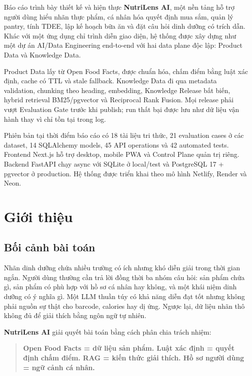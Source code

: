 \documentclass[12pt,a4paper]{report}
\newcommand{\project}{\textbf{NutriLens AI}}
\begin{document}
Báo cáo trình bày thiết kế và hiện thực \project{}, một nền tảng hỗ trợ người
dùng hiểu nhãn thực phẩm, cá nhân hóa quyết định mua sắm, quản lý pantry, tính
TDEE, lập kế hoạch bữa ăn và đặt câu hỏi dinh dưỡng có trích dẫn. Khác với một
ứng dụng chỉ trình diễn giao diện, hệ thống được xây dựng như một dự án
AI/Data Engineering end-to-end với hai data plane độc lập: Product Data và
Knowledge Data.

Product Data lấy từ Open Food Facts, được chuẩn hóa, chấm điểm bằng luật xác
định, cache có TTL và stale fallback. Knowledge Data đi qua metadata validation,
chunking theo heading, embedding, Knowledge Release bất biến, hybrid retrieval
BM25/pgvector và Reciprocal Rank Fusion. Mọi release phải vượt Evaluation Gate
trước khi publish; run thất bại được lưu như dữ liệu vận hành thay vì chỉ tồn
tại trong log.

Phiên bản tại thời điểm báo cáo có 18 tài liệu tri thức, 21 evaluation cases ở
các dataset, 14 SQLAlchemy models, 45 API operations và 42 automated tests.
Frontend Next.js hỗ trợ desktop, mobile PWA và Control Plane quản trị riêng.
Backend FastAPI chạy async với SQLite ở local/test và PostgreSQL 17 + pgvector
ở production. Hệ thống được triển khai theo mô hình Netlify, Render và Neon.

\tableofcontents
\listoffigures
\listoftables
\clearpage
{}

\chapter{Giới thiệu}

\section{Bối cảnh bài toán}

Nhãn dinh dưỡng chứa nhiều trường có ích nhưng khó diễn giải trong thời gian
ngắn. Người dùng thường cần trả lời đồng thời ba nhóm câu hỏi: sản phẩm chứa gì,
sản phẩm có phù hợp với hồ sơ cá nhân hay không, và một khái niệm dinh dưỡng có
ý nghĩa gì. Một LLM thuần túy có khả năng diễn đạt tốt nhưng không phải nguồn
sự thật cho barcode, calories hay dị ứng. Ngược lại, dữ liệu nhãn thô không đủ
để giải thích bằng ngôn ngữ tự nhiên.

\project{} giải quyết bài toán bằng cách phân chia trách nhiệm:

\begin{quote}
\textbf{Open Food Facts = dữ liệu sản phẩm. Luật xác định = quyết định chấm
điểm. RAG = kiến thức giải thích. Hồ sơ người dùng = ngữ cảnh cá nhân.}
\end{quote}
\end{document}
